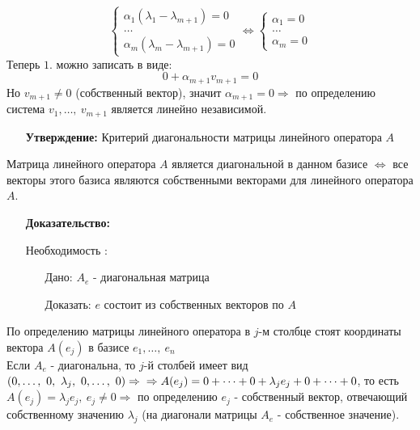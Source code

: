 \documentclass[12pt, letterpaper, twoside]{article}
\begin{document}
         \[\begin{cases}
            \alpha_1(\lambda_1 - \lambda_{m + 1}) = 0\\
            \dots\\
            \alpha_m(\lambda_m - \lambda_{m + 1}) = 0
         \end{cases}\Leftrightarrow \begin{cases}
            \alpha_1 = 0\\
            \dots\\
            \alpha_m = 0
         \end{cases}\]
         Теперь $1.$ можно записать в виде:
         \[0 + \alpha_{m + 1}v_{m + 1} = 0\]
         Но $v_{m + 1} \neq 0$ (собственный вектор), значит $\alpha_{m + 1} = 0\Rightarrow$ по определению система $v_1,\dots,\ v_{m + 1}$ является линейно независимой.
         \begin{enumerate}
            \item[\textbf{Утверждение:}] Критерий диагональности матрицы линейного оператора $A$
         \end{enumerate} 
         Матрица линейного оператора $A$ является диагональной в данном базисе $\Leftrightarrow$ все векторы этого базиса являются собственными векторами для линейного оператора $A$.
         \begin{enumerate}
            \item[\textbf{Доказательство:}]
         \end{enumerate}
         \begin{enumerate}
            \item[Необходимость]:
            \begin{enumerate}
                \item[Дано:] $A_e$ - диагональная матрица
                \item[Доказать:] $e$ состоит из собственных векторов по $A$ 
            \end{enumerate}
         \end{enumerate}
         По определению матрицы линейного оператора в $j$-м столбце стоят координаты вектора $A(e_j)$ в базисе $e_1,\dots,\ e_n$\\
         Если $A_e$ - диагональна, то $j$-й столбей имеет вид $(0,\dots,\ 0,\ \lambda_j,\ 0,\dots,\ 0)\Rightarrow\\
         \Rightarrow A(e_j) = 0 + \dots + 0 + \lambda_j e_j + 0 + \dots + 0$, то есть $A(e_j) = \lambda_j e_j,\ e_j \neq 0\Rightarrow$ по определению $e_j$ - собственный вектор, отвечающий собственному значению $\lambda_j$ (на диагонали матрицы $A_e$ - собственное значение).
\end{document}
